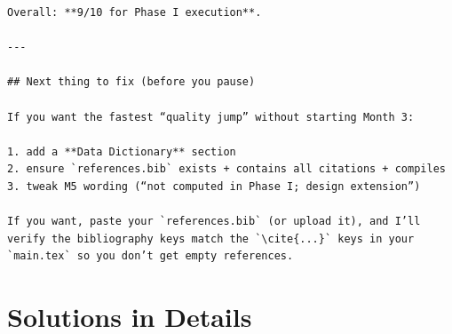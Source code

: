 \documentclass[11pt,a4paper]{article}
\begin{document}
\begin{verbatim}
Overall: **9/10 for Phase I execution**.

---

## Next thing to fix (before you pause)

If you want the fastest “quality jump” without starting Month 3:

1. add a **Data Dictionary** section
2. ensure `references.bib` exists + contains all citations + compiles
3. tweak M5 wording (“not computed in Phase I; design extension”)

If you want, paste your `references.bib` (or upload it), and I’ll verify the bibliography keys match the `\cite{...}` keys in your `main.tex` so you don’t get empty references.
\end{verbatim}

\newpage
\section{Solutions in Details}
\end{document}
